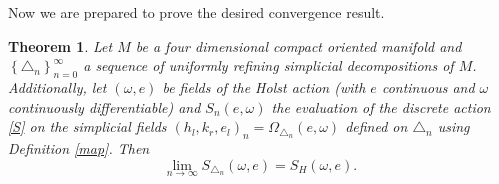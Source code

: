 \documentclass{article}
\newtheorem{theorem}{Theorem}
\begin{document}
Now we are prepared to prove the desired convergence result. 
\begin{theorem}\label{theo1}
	Let $M$ be a four dimensional compact oriented manifold and $\left\{\triangle_{n}\right\}_{n=0}^{\infty}$ a sequence of uniformly refining simplicial decompositions of $M$. Additionally, let $(\omega, e)$ be fields of the Holst action (with $e$ continuous and $\omega$ continuously differentiable) and $S_{n}(e,\omega)$ the evaluation of the discrete action \eqref{S} on the simplicial fields $(h_l,k_r,e_l)_{n}=\Omega_{\triangle_n}(e,\omega)$ defined on $\triangle_n$ using Definition \ref{map}. Then 
	\begin{equation}\label{conlim}
		\lim_{n\rightarrow\infty}S_{\triangle_n}(\omega,e)=S_{H}(\omega,e) .
	\end{equation}	
\end{theorem}
\end{document}
